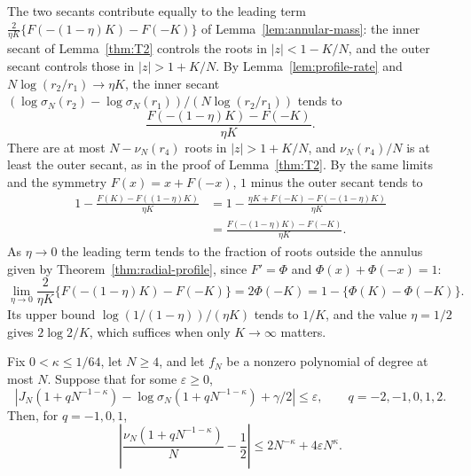 The two secants contribute equally to the leading term
$\frac2{\eta K}\{F(-(1-\eta)K)-F(-K)\}$ of
Lemma~\ref{lem:annular-mass}: the inner secant of Lemma~\ref{thm:T2}
controls the roots in $|z|<1-K/N$, and the outer secant controls those in
$|z|>1+K/N$.
By Lemma~\ref{lem:profile-rate} and $N\log(r_2/r_1)\to\eta K$, the inner
secant $(\log\sigma_N(r_2)-\log\sigma_N(r_1))/(N\log(r_2/r_1))$ tends to
\[
 \frac{F(-(1-\eta)K)-F(-K)}{\eta K}.
\]
There are at most $N-\nu_N(r_4)$ roots in $|z|>1+K/N$, and
$\nu_N(r_4)/N$ is at least the outer secant, as in the proof of
Lemma~\ref{thm:T2}. By the same limits and the symmetry $F(x)=x+F(-x)$,
$1$ minus the outer secant tends to
\begin{align*}
 1-\frac{F(K)-F((1-\eta)K)}{\eta K}
 &=1-\frac{\eta K+F(-K)-F(-(1-\eta)K)}{\eta K}\\
 &=\frac{F(-(1-\eta)K)-F(-K)}{\eta K}.
\end{align*}
As $\eta\to0$ the leading term tends to the fraction of roots outside the
annulus given by Theorem~\ref{thm:radial-profile}, since $F'=\Phi$ and
$\Phi(x)+\Phi(-x)=1$:
\[
 \lim_{\eta\to0}\frac2{\eta K}\{F(-(1-\eta)K)-F(-K)\}
 =2\Phi(-K)=1-\{\Phi(K)-\Phi(-K)\}.
\]
Its upper bound $\log(1/(1-\eta))/(\eta K)$ tends to $1/K$, and the value
$\eta=1/2$ gives $2\log2/K$, which suffices when only $K\to\infty$
matters.

\begin{lemma}\label{lem:thin-band}
Fix $0<\kappa\le1/64$, let $N\ge4$, and let $f_N$
be a nonzero polynomial of degree at most $N$.
Suppose that for some $\varepsilon\ge0$,
\[
 \left|J_N(1+qN^{-1-\kappa})-\log\sigma_N(1+qN^{-1-\kappa})+\gamma/2\right|\le\varepsilon,
 \qquad q=-2,-1,0,1,2.
\]
Then, for $q=-1,0,1$,
\[
 \left|\frac{\nu_N(1+qN^{-1-\kappa})}N-\frac12\right|
 \le2N^{-\kappa}+4\varepsilon N^{\kappa}.
\]
\end{lemma}

